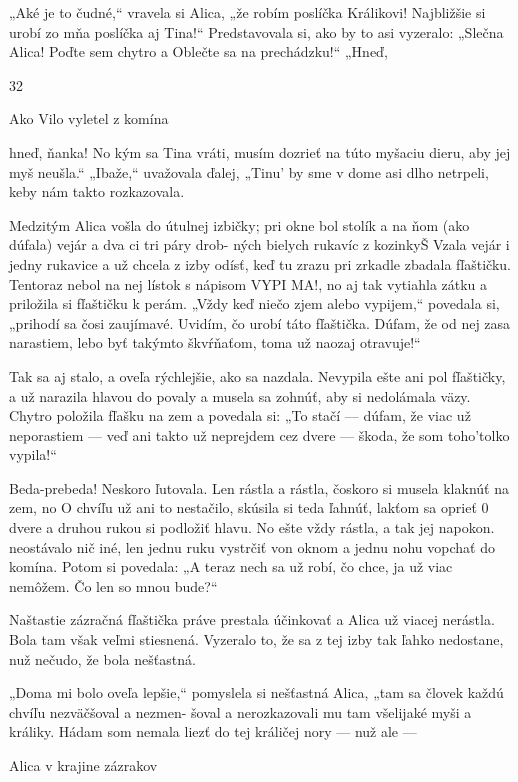 \documentclass[12pt]{book}
\begin{document}
\begin{Parallel}[p]{}{}
{„Aké je to čudné,“ vravela si Alica, „že robím poslíčka
Králikovi! Najbližšie si urobí zo mňa poslíčka aj Tina!“
Predstavovala si, ako by to asi vyzeralo: „Slečna Alica!
Poďte sem chytro a Oblečte sa na prechádzku!“ „Hneď,

32

Ako Vilo vyletel z komína

hneď, ňanka! No kým sa Tina vráti, musím dozrieť na túto
myšaciu dieru, aby jej myš neušla.“ „Ibaže,“ uvažovala
ďalej, „Tinu' by sme v dome asi dlho netrpeli, keby nám
takto rozkazovala.

Medzitým Alica vošla do útulnej izbičky; pri okne bol
stolík a na ňom (ako dúfala) vejár a dva ci tri páry drob-
ných bielych rukavíc z kozinkyŠ Vzala vejár i jedny rukavice
a už chcela z izby odísť, keď tu zrazu pri zrkadle zbadala
fľaštičku. Tentoraz nebol na nej lístok s nápisom VYPI MA!,
no aj tak vytiahla zátku a priložila si fľaštičku k perám.
„Vždy keď niečo zjem alebo vypijem,“ povedala si, „prihodí
sa čosi zaujímavé. Uvidím, čo urobí táto fľaštička. Dúfam,
že od nej zasa narastiem, lebo byť takýmto škvŕňaťom,
toma už naozaj otravuje!“

Tak sa aj stalo, a oveľa rýchlejšie, ako sa nazdala.
Nevypila ešte ani pol fľaštičky, a už narazila hlavou do
povaly a musela sa zohnúť, aby si nedolámala väzy. Chytro
položila fľašku na zem a povedala si: „To stačí — dúfam, že
viac už neporastiem — veď ani takto už neprejdem cez
dvere — škoda, že som toho'tolko vypila!“

Beda-prebeda! Neskoro ľutovala. Len rástla a rástla,
čoskoro si musela klaknúť na zem, no O chvíľu už ani to
nestačilo, skúsila si teda ľahnúť, lakťom sa oprieť 0 dvere
a druhou rukou si podložiť hlavu. No ešte vždy rástla, a tak
jej napokon. neostávalo nič iné, len jednu ruku vystrčiť von
oknom a jednu nohu vopchať do komína. Potom si
povedala: „A teraz nech sa už robí, čo chce, ja už viac
nemôžem. Čo len so mnou bude?“

Naštastie zázračná fľaštička práve prestala účinkovať
a Alica už viacej nerástla. Bola tam však veľmi stiesnená.
Vyzeralo to, že sa z tej izby tak ľahko nedostane, nuž
nečudo, že bola nešťastná.

„Doma mi bolo oveľa lepšie,“ pomyslela si nešťastná
Alica, „tam sa človek každú chvíľu nezväčšoval a nezmen-
šoval a nerozkazovali mu tam všelijaké myši a králiky.
Hádam som nemala liezť do tej králičej nory — nuž ale —


 

Alica v krajine zázrakov

}
\end{Parallel}
\end{document}
